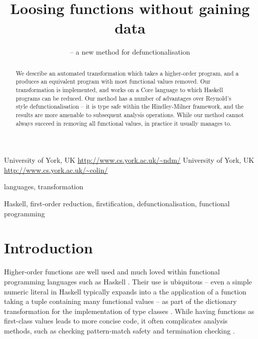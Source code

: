 \documentclass[preprint]{sigplanconf}
\begin{document}
\copyrightdata{[to be supplied]}

\titlebanner{\today{} - \currenttime{}}        %
\preprintfooter{}   %

\title{Loosing functions without gaining data}
\subtitle{ -- a new method for defunctionalisation}

           {University of York, UK}
           {\url{http://www.cs.york.ac.uk/~ndm/}}
           {University of York, UK}
           {\url{http://www.cs.york.ac.uk/~colin/}}

\maketitle

\begin{abstract}
We describe an automated transformation which takes a higher-order program, and a produces an equivalent program with most functional values removed. Our transformation is implemented, and works on a Core language to which Haskell programs can be reduced. Our method has a number of advantages over Reynold's style defunctionalisation -- it is type safe within the Hindley-Milner framework, and the results are more amenable to subsequent analysis operations. While our method cannot always succeed in removing all functional values, in practice it usually manages to.
\end{abstract}


\terms
languages, transformation

\keywords
Haskell, first-order reduction, firstification, defunctionalisation, functional programming

\section{Introduction}

Higher-order functions are well used and much loved within functional programming languages such as Haskell \cite{haskell}. Their use is ubiquitous -- even a simple numeric literal in Haskell typically expands into a the application of a function taking a tuple containing many functional values -- as part of the dictionary transformation for the implementation of type classes \cite{wadler:typeclasses}. While having functions as first-class values leads to more concise code, it often complicates analysis methods, such as checking pattern-match safety \cite{catch} and termination checking \cite{termination_checking}.
\end{document}
